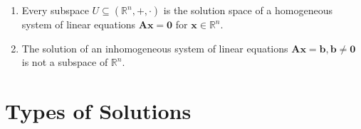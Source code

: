 \begin{enumerate}
    \item Every subspace $U \subseteq (\mathbb{R}^n , +, \cdot)$ is the solution space of a homogeneous system of linear equations $\bm{Ax} = \bm{0}$ for $\bm{x} \in \mathbb{R}^n$.
    \hfill \cite{mfml/book/mml/Deisenroth-Faisal-Ong}

    \item The solution of an inhomogeneous system of linear equations $\bm{Ax} = \bm{b}, \bm{b} \neq \bm{0}$ is not a subspace of $\mathbb{R}^n$.
    \hfill \cite{mfml/book/mml/Deisenroth-Faisal-Ong}

    
\end{enumerate}








\section{Types of Solutions}

